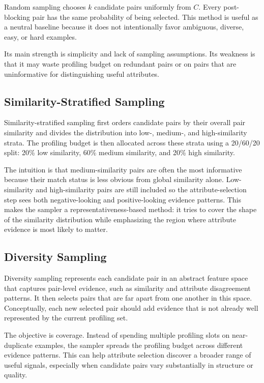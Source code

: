 \documentclass[11pt]{article}
\begin{document}
Random sampling chooses \(k\) candidate pairs uniformly from \(C\). Every post-blocking pair has the same probability of being selected. This method is useful as a neutral baseline because it does not intentionally favor ambiguous, diverse, easy, or hard examples.

Its main strength is simplicity and lack of sampling assumptions. Its weakness is that it may waste profiling budget on redundant pairs or on pairs that are uninformative for distinguishing useful attributes.

\subsection{Similarity-Stratified Sampling}

Similarity-stratified sampling first orders candidate pairs by their overall pair similarity and divides the distribution into low-, medium-, and high-similarity strata. The profiling budget is then allocated across these strata using a 20/60/20 split: 20\% low similarity, 60\% medium similarity, and 20\% high similarity.

The intuition is that medium-similarity pairs are often the most informative because their match status is less obvious from global similarity alone. Low-similarity and high-similarity pairs are still included so the attribute-selection step sees both negative-looking and positive-looking evidence patterns. This makes the sampler a representativeness-based method: it tries to cover the shape of the similarity distribution while emphasizing the region where attribute evidence is most likely to matter.

\subsection{Diversity Sampling}

Diversity sampling represents each candidate pair in an abstract feature space that captures pair-level evidence, such as similarity and attribute disagreement patterns. It then selects pairs that are far apart from one another in this space. Conceptually, each new selected pair should add evidence that is not already well represented by the current profiling set.

The objective is coverage. Instead of spending multiple profiling slots on near-duplicate examples, the sampler spreads the profiling budget across different evidence patterns. This can help attribute selection discover a broader range of useful signals, especially when candidate pairs vary substantially in structure or quality.
\end{document}
